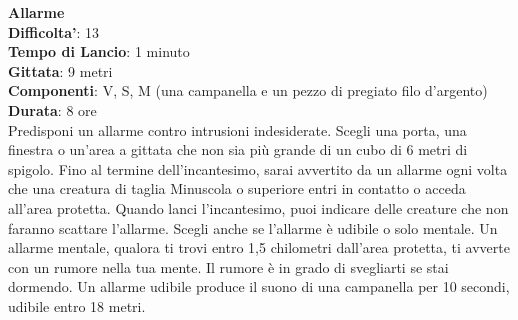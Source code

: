 \begin{multicols}{2}
\medskip\textbf{Allarme}\\
\textbf{Difficolta'}: 13\\
\textbf{Tempo di Lancio}: 1 minuto\\
\textbf{Gittata}: 9 metri\\
\textbf{Componenti}: V, S, M (una campanella e un pezzo di pregiato filo d’argento)\\
\textbf{Durata}: 8 ore\\
Predisponi un allarme contro intrusioni indesiderate. Scegli una porta, una finestra o un’area a gittata che non sia più grande di un cubo di 6 metri di spigolo. Fino al termine dell’incantesimo, sarai avvertito da un allarme ogni volta che una creatura di taglia Minuscola o superiore entri in contatto o acceda all’area protetta. Quando lanci l’incantesimo, puoi indicare delle creature che non faranno scattare l’allarme. Scegli anche se l’allarme è udibile o solo mentale. Un allarme mentale, qualora ti trovi entro 1,5 chilometri dall’area protetta, ti avverte con un rumore nella tua mente. Il rumore è in grado di svegliarti se stai dormendo. Un allarme udibile produce il suono di una campanella per 10 secondi, udibile entro 18 metri.


\end{multicols}
